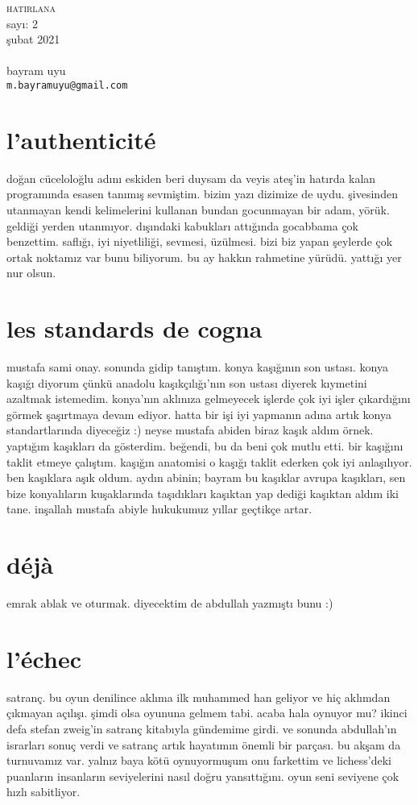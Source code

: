 \documentclass[a4paper, twocolumn, openright]{memoir}
\begin{document}
\thispagestyle{plain}
\noindent
{\HUGE\textsc{hatirlana}\\\small{}sayı: 2\\şubat 2021}\\\\
{\small{}bayram uyu\\\texttt{m.bayramuyu@gmail.com}}
\bigskip
\section{l'authenticité}
doğan cüceloloğlu adını eskiden beri duysam da veyis ateş’in hatırda
kalan programında esasen tanımış sevmiştim. bizim yazı dizimize de uydu.
şivesinden utanmayan kendi kelimelerini kullanan bundan gocunmayan bir
adam, yörük. geldiği yerden utanmıyor. dışındaki kabukları attığında
gocabbama çok benzettim. saflığı, iyi niyetliliği, sevmesi, üzülmesi.
bizi biz yapan şeylerde çok ortak noktamız var bunu biliyorum. bu ay
hakkın rahmetine yürüdü. yattığı yer nur olsun.
\section{les standards de cogna}
mustafa sami onay. sonunda gidip tanıştım. konya kaşığının son ustası.
konya kaşığı diyorum çünkü anadolu kaşıkçılığı’nın son ustası diyerek
kıymetini azaltmak istemedim. konya’nın aklınıza gelmeyecek işlerde çok
iyi işler çıkardığını görmek şaşırtmaya devam ediyor. hatta bir işi iyi
yapmanın adına artık konya standartlarında diyeceğiz :) neyse mustafa
abiden biraz kaşık aldım örnek. yaptığım kaşıkları da gösterdim. beğendi,
bu da beni çok mutlu etti. bir kaşığını taklit etmeye çalıştım. kaşığın
anatomisi o kaşığı taklit ederken çok iyi anlaşılıyor. ben kaşıklara aşık
oldum. aydın abinin; bayram bu kaşıklar avrupa kaşıkları, sen bize
konyalıların kuşaklarında taşıdıkları kaşıktan yap dediği kaşıktan aldım
iki tane. inşallah mustafa abiyle hukukumuz yıllar geçtikçe artar.
\section{déjà}
emrak ablak ve oturmak. diyecektim de abdullah yazmıştı bunu :)
\section{l'échec}
satranç. bu oyun denilince aklıma ilk muhammed han geliyor ve hiç
aklımdan çıkmayan açılışı. şimdi olsa oyununa gelmem tabi. acaba hala
oynuyor mu? ikinci defa stefan zweig’in satranç kitabıyla gündemime
girdi. ve sonunda abdullah’ın israrları sonuç verdi ve satranç artık
hayatımın önemli bir parçası. bu akşam da turnuvamız var. yalnız baya
kötü oynuyormuşum onu farkettim ve lichess’deki puanların insanların
seviyelerini nasıl doğru yansıttığını. oyun seni seviyene çok hızlı
sabitliyor.
\end{document}
